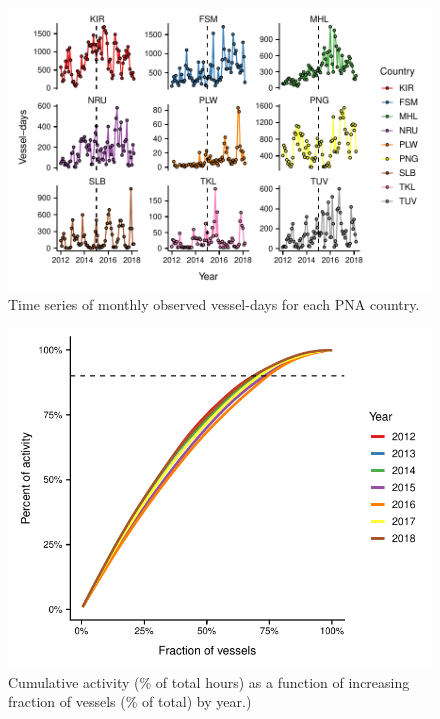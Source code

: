 \documentclass[9p,twocolumn,twoside,lineno]{pnas-new}
\begin{document}
\begin{figure}[H]
\centering
\includegraphics{img/PS_VDS_PNA_by_month_eez.pdf}
\caption{\label{PS_VDS_PNA_by_month_eez}Time series of monthly observed vessel-days for each PNA country.}
\end{figure}

\begin{figure}[H]
\centering
\includegraphics{img/nvessels_to_90.pdf}
\caption{\label{fig:nvessels_to_90}Cumulative activity (\% of total hours) as a function of increasing fraction of vessels (\% of total) by year.)}
\end{figure}



\end{document}
